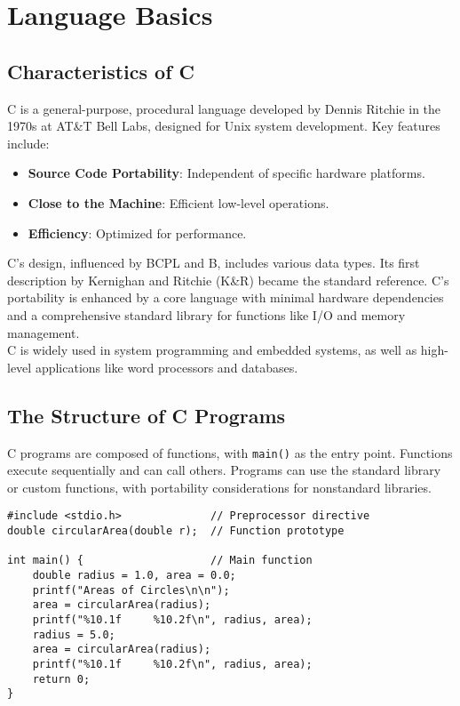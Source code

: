 
\section{Language Basics}

\subsection{Characteristics of C}
C is a general-purpose, procedural language developed by Dennis Ritchie in the 1970s at AT\&T Bell Labs, designed for Unix system development. Key features include:
\begin{itemize}
    \item \textbf{Source Code Portability}: Independent of specific hardware platforms.
    \item \textbf{Close to the Machine}: Efficient low-level operations.
    \item \textbf{Efficiency}: Optimized for performance.
\end{itemize}
C’s design, influenced by BCPL and B, includes various data types. Its first description by Kernighan and Ritchie (K\&R) became the standard reference. C’s portability is enhanced by a core language with minimal hardware dependencies and a comprehensive standard library for functions like I/O and memory management.\\
C is widely used in system programming and embedded systems, as well as high-level applications like word processors and databases.\\


\subsection{The Structure of C Programs}
C programs are composed of functions, with \texttt{main()} as the entry point. Functions execute sequentially and can call others. Programs can use the standard library or custom functions, with portability considerations for nonstandard libraries.
\begin{tcolorbox}[title=Example structure of C program]
\begin{verbatim}
#include <stdio.h>              // Preprocessor directive
double circularArea(double r);  // Function prototype

int main() {                    // Main function
    double radius = 1.0, area = 0.0;
    printf("Areas of Circles\n\n");
    area = circularArea(radius);
    printf("%10.1f     %10.2f\n", radius, area);
    radius = 5.0;
    area = circularArea(radius);
    printf("%10.1f     %10.2f\n", radius, area);
    return 0;
}
\end{verbatim}
\end{tcolorbox}


